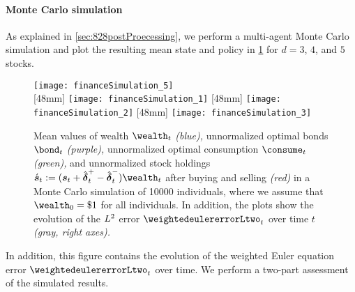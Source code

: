 \paragraph{Monte Carlo simulation}

As explained in \cref{sec:828postProecessing},
we perform a multi-agent Monte Carlo simulation
and plot the resulting mean state and policy in \cref{fig:financeSimulation}
for $d = 3$, $4$, and $5$ stocks.
\begin{figure}
  \texttt{[image: financeSimulation\_5]}%
  \\[2mm]%
  [48mm]{%
    \texttt{[image: financeSimulation\_1]}%
  }%
  \hfill%
  [48mm]{%
    \texttt{[image: financeSimulation\_2]}%
  }%
  \hfill%
  [48mm]{%
    \texttt{[image: financeSimulation\_3]}%
  }%
    \caption[Monte Carlo simulation of the TCP]{%
      Mean values of
      wealth $\wealth_t$
      \emph{\textcolor{C0}{(blue)},}
      unnormalized optimal bonds $\bond_t$
      \emph{\textcolor{C3}{(purple)},}
      unnormalized optimal consumption $\consume_t$
      \emph{\textcolor{C4}{(green)},} and
      unnormalized stock holdings
      $
        \acute{\vstock}_t
        := (\vstock_t + \vnormbuy_t - \vnormsell_t) \wealth_t
      $
      after buying and selling
      \emph{\textcolor{C1}{(red)}}
      \vspace{0.1em}%
      in a Monte Carlo simulation of \num{10000} individuals,
      \vspace{-0.1em}%
      where we assume that $\wealth_0 = \$1$ for all individuals.
      In addition, the plots show the evolution of the
      $L^2$ error $\weightedeulererrorLtwo_t$ over time $t$
      \emph{\textcolor{C8}{(gray, right axes)}.}%
    }%
    \label{fig:financeSimulation}%
\end{figure}%
In addition, this figure contains the evolution of the
weighted Euler equation error $\weightedeulererrorLtwo_t$ over time.
We perform a two-part assessment of the simulated results.
